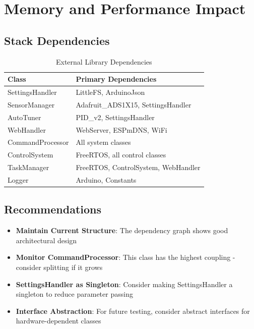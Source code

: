 \documentclass[12pt,a4paper]{article}
\begin{document}
\section{Memory and Performance Impact}

\subsection{Stack Dependencies}
\begin{table}[h!]
\centering
\begin{tabular}{@{}ll@{}}
\toprule
\textbf{Class} & \textbf{Primary Dependencies} \\
\midrule
SettingsHandler & LittleFS, ArduinoJson \\
SensorManager & Adafruit\_ADS1X15, SettingsHandler \\
AutoTuner & PID\_v2, SettingsHandler \\
WebHandler & WebServer, ESPmDNS, WiFi \\
CommandProcessor & All system classes \\
ControlSystem & FreeRTOS, all control classes \\
TaskManager & FreeRTOS, ControlSystem, WebHandler \\
Logger & Arduino, Constants \\
\bottomrule
\end{tabular}
\caption{External Library Dependencies}
\end{table}

\subsection{Recommendations}

\begin{itemize}
    \item \textbf{Maintain Current Structure}: The dependency graph shows good architectural design
    \item \textbf{Monitor CommandProcessor}: This class has the highest coupling - consider splitting if it grows
    \item \textbf{SettingsHandler as Singleton}: Consider making SettingsHandler a singleton to reduce parameter passing
    \item \textbf{Interface Abstraction}: For future testing, consider abstract interfaces for hardware-dependent classes
\end{itemize}
\end{document}
